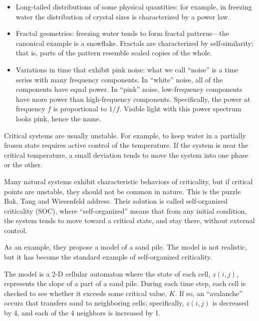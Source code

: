 \documentclass[10pt]{book}
\begin{document}
\begin{itemize}

\item Long-tailed distributions of some physical quantities: for
  example, in freezing water the distribution of crystal sizes is
  characterized by a power law.

\item Fractal geometries: freezing water tends to form fractal
  patterns---the canonical example is a snowflake.  Fractals
  are characterized by self-similarity; that is, parts of the
  pattern resemble scaled copies of the whole.

\item Variations in time that exhibit pink noise: what we call
  ``noise'' is a time series with many frequency components.  In
  ``white'' noise, all of the components have equal power.  In
  ``pink'' noise, low-frequency components have more power than
  high-frequency components.  Specifically, the power at frequency $f$
  is proportional to $1/f$.  Visible light with this power spectrum
  looks pink, hence the name.

\end{itemize}

Critical systems are usually unstable.  For example, to keep
water in a partially frozen state requires active control of
the temperature.  If the system is near the critical
temperature, a small deviation tends to move the system
into one phase or the other.

Many natural systems exhibit characteristic behaviors of
criticality, but if critical points are unstable, they should
not be common in nature.  This is the puzzle Bak, Tang and
Wiesenfeld address.  Their solution is called self-organized
criticality (SOC), where ``self-organized'' means that from
any initial condition, the system tends to move toward a
critical state, and stay there, without external control.

As an example, they propose a model of a sand pile.  The model
is not realistic, but
it has become the standard example of self-organized criticality.

The model is a 2-D cellular automaton where the state of each cell,
$z(i,j)$, represents the slope of a part of a sand pile.  During each
time step, each cell is checked to see whether it exceeds some
critical value, $K$.  If so, an ``avalanche'' occurs that transfers
sand to neighboring cells; specifically, $z(i,j)$ is decreased by 4,
and each of the 4 neighbors is increased by 1.
\end{document}
